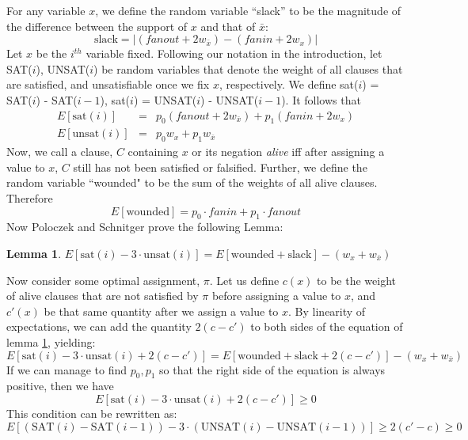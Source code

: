 \documentclass[11pt,letter]{article}
\newtheorem{lemma}{Lemma}
\begin{document}
For any variable $x$, we define the random variable ``slack'' to be the magnitude of the difference between the support of $x$ and that of $\bar{x}$:
\begin{equation}
\text{slack} = |(fanout + 2w_{\bar{x}}) -(fanin + 2w_x)|
\end{equation}
Let $x$ be the $i^{th}$ variable fixed. Following our notation in the introduction, let SAT($i$), UNSAT($i$) be random variables that denote the weight of all clauses that are satisfied, and unsatisfiable once we fix $x$, respectively. We define sat($i$) = SAT($i$) - SAT($i-1$), sat($i$) = UNSAT($i$) - UNSAT($i-1$). It follows that
\begin{eqnarray}
E[\text{sat}(i)] &=& p_0(fanout + 2w_{\bar{x}}) + p_1(fanin + 2w_{x})\\
E[\text{unsat}(i)] &=& p_0w_x + p_1w_{\bar{x}}
\end{eqnarray}
Now, we call a clause, $C$ containing $x$ or its negation \textit{alive} iff after assigning a value to $x$, $C$ still has not been satisfied or falsified. Further, we define the random variable ``wounded" to be the sum of the weights of all alive clauses. Therefore
\begin{equation}
E[\text{wounded}] = p_0 \cdot fanin + p_1 \cdot fanout
\end{equation}
Now Poloczek and Schnitger prove the following Lemma:
\begin{lemma} \label{L:2}
$E[\text{sat}(i) - 3\cdot\text{unsat}(i)] = E[\text{wounded} + \text{slack}] - (w_x + w_{\bar{x}})$
\end{lemma}
Now consider some optimal assignment, $\pi$. Let us define $c(x)$ to be the weight of alive clauses that are not satisfied by $\pi$ before assigning a value to $x$, and $c'(x)$ be that same quantity after we assign a value to $x$. By linearity of expectations, we can add the quantity $2(c-c')$ to both sides of the equation of lemma \ref{L:2}, yielding:
\begin{equation}
E[\text{sat}(i) - 3\cdot\text{unsat}(i)+ 2(c-c')] = E[\text{wounded} + \text{slack} + 2(c-c')] - (w_x + w_{\bar{x}})
\end{equation}
If we can manage to find $p_0,p_1$ so that the right side of the equation is always positive, then we have 
\begin{equation}
E[\text{sat}(i) - 3\cdot\text{unsat}(i)+ 2(c-c')] \ge 0 \label{C:1}
\end{equation}
This condition can be rewritten as:
\begin{equation}
E[(\text{SAT}(i) - \text{SAT}(i-1)) - 3\cdot(\text{UNSAT}(i) - \text{UNSAT}(i-1))] \ge  2(c'-c) \ge 0
\end{equation}
\end{document}
